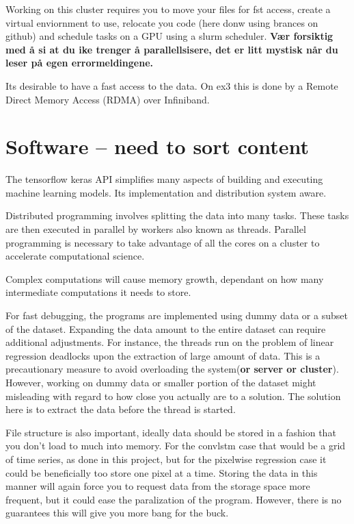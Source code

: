Working on this cluster requires you to move your files for fst access, create a virtual enviornment to use, relocate you code (here donw using brances on github) and schedule tasks on a GPU using a slurm scheduler. 
\textbf{Vær forsiktig med å si at du ike trenger å parallellsisere, det er litt mystisk når du leser på egen errormeldingene.}

Its desirable to have a fast access to the data. On ex3 this is done by a Remote Direct Memory Access (RDMA) over Infiniband.

\section{Software -- need to sort content}
The tensorflow keras API simplifies many aspects of building and executing machine learning models. Its implementation and distribution system aware. 

Distributed programming involves splitting the data into many tasks. These tasks are then executed in parallel by workers also known as threads. Parallel programming is necessary to take advantage of all the cores on a cluster to accelerate computational science. 

Complex computations will cause memory growth, dependant on how many intermediate computations it needs to store.

For fast debugging, the programs are implemented using dummy data or a subset of the dataset. Expanding the data amount to the entire dataset can require additional adjustments. For instance, the threads run on the problem of linear regression deadlocks upon the extraction of large amount of data. This is a precautionary measure to avoid overloading the system(\textbf{or server or cluster}).
However, working on dummy data or smaller portion of the dataset might misleading with regard to how close you actually are to a solution. The solution here is to extract the data before the thread is started.


File structure is also important, ideally data should be stored in a fashion that you don't load to much into memory. For the \acrshort{convlstm} case that would be a grid of time series, as done in this project, but for the pixelwise regression case it could be beneficially too store one pixel at a time. Storing the data in this manner will again force you to request data from the storage space more frequent, but it could ease the paralization of the program. However, there is no guarantees this will give you more bang for the buck. 


